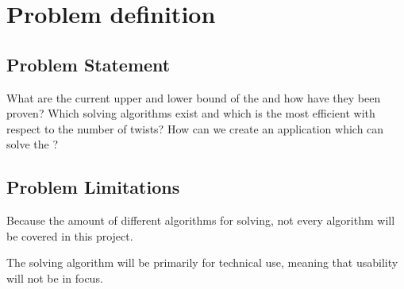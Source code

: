 \chapter{Problem definition}
\section{Problem Statement}
What are the current upper and lower bound of the \rubik{} and how have they been proven? \newline\newline
Which solving algorithms exist and which is the most efficient with respect to the number of twists?\newline\newline
How can we create an application which can solve the \rubik{}?

\section{Problem Limitations}
Because the amount of different algorithms for \rubik{} solving, not every algorithm will be covered in this project.

The \rubik{} solving algorithm will be primarily for technical use, meaning that usability will not be in focus.